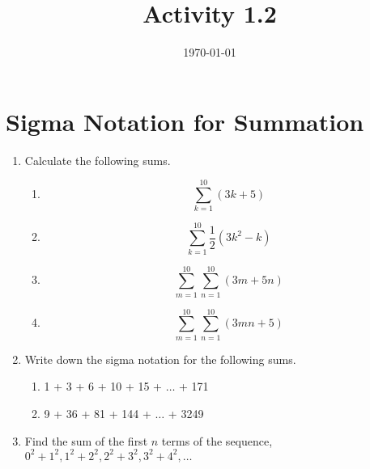 \documentclass[12pt]{amsart}
\title{Activity 1.2}
\date{\today}
\begin{document}
\maketitle
\part*{Sigma Notation for Summation}
\begin{enumerate}
\item Calculate the following sums.%
  \begin{enumerate}
    \item \begin{equation*}
      \sum_{k = 1}^{10} (3k + 5)
    \end{equation*}
    \item \begin{equation*}
      \sum_{k = 1}^{10} \frac{1}{2}(3k^2 - k)
    \end{equation*}
    \item \begin{equation*}
      \sum_{m = 1}^{10}\sum_{n = 1}^{10} (3m + 5n)
    \end{equation*}
    \item \begin{equation*}
      \sum_{m = 1}^{10}\sum_{n = 1}^{10} (3mn + 5)
    \end{equation*}
    
  \end{enumerate}
\item Write down the sigma notation for the following sums.%
  \begin{enumerate}
    \item 1 + 3 + 6 + 10 + 15 + $\ldots$ + 171%
    \item 9 + 36 + 81 + 144 + $\ldots$ + 3249%
  \end{enumerate}
\item Find the sum of the first $n$ terms of the sequence,\\ $0^2 + 1^2, 1^2 + 2^2, 2^2 + 3^2, 3^2 + 4^2, \ldots$
\end{enumerate}
\end{document}
